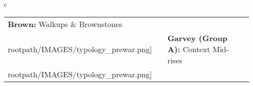 \begin{table}[H]
        \begin{tabular}{c}
        \begin{tabular}{m{1.25in} m{2in} m{.1in} m{1.25in} m{2in}}
\textbf{Brown:} {Walkups \& Brownstones} & \texttt{[image: \\rootpath/IMAGES/typology\_prewar.png]} & & \textbf{Garvey (Group A):} {Context Mid-rises} & \texttt{[image: \\rootpath/IMAGES/typology\_prewar.png]}
\end{tabular}\end{tabular}
        \end{table}